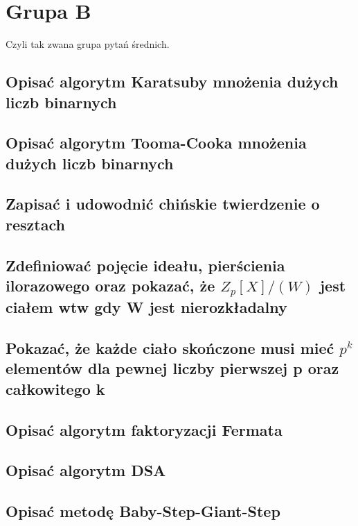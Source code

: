 \section{Grupa B}
Czyli tak zwana grupa pytań średnich.
\subsection{Opisać algorytm Karatsuby mnożenia dużych liczb binarnych}


\subsection{Opisać algorytm Tooma-Cooka mnożenia dużych liczb binarnych}



\subsection{Zapisać i udowodnić chińskie twierdzenie o resztach}




\subsection{Zdefiniować pojęcie ideału, pierścienia ilorazowego oraz pokazać, że $Z_p[X]/(W)$ jest ciałem wtw gdy W jest nierozkładalny}



\subsection{Pokazać, że każde ciało skończone musi mieć $p^k$ elementów dla pewnej liczby pierwszej p oraz całkowitego k}


\subsection{Opisać algorytm faktoryzacji Fermata}



\subsection{Opisać algorytm DSA}


\subsection{Opisać metodę Baby-Step-Giant-Step}


